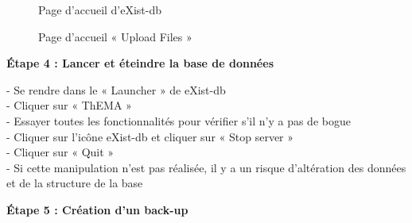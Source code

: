 \begin{figure}[H]
	\centering
	\caption{Page d'accueil d'eXist-db}
\end{figure}

\begin{figure}[H]
	\centering
	\caption{Page d'accueil « Upload Files »}
\end{figure}
	
\textbf{Étape 4 : Lancer et éteindre la base de données} 
	
\begin{flushleft}
	- Se rendre dans le « Launcher » de eXist-db \\
	- Cliquer sur « ThEMA » \\
	- Essayer toutes les fonctionnalités pour vérifier s'il n'y a pas de bogue \\
	
	- Cliquer sur l'icône eXist-db et cliquer sur « Stop server » \\
	- Cliquer sur « Quit »\\
	- Si cette manipulation n'est pas réalisée, il y a un risque d'altération des données et de la structure de la base \\
	
\end{flushleft}
	
\textbf{Étape 5 : Création d'un back-up} 
	 
